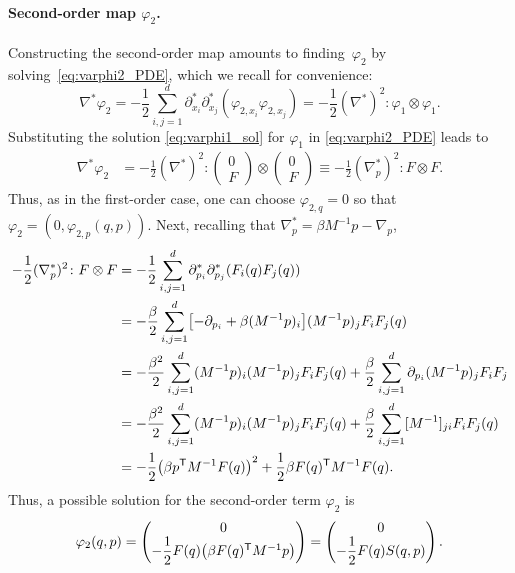 \paragraph{Second-order map $\varphi_2$.} Constructing the second-order map amounts to finding~$\varphi_2$ by solving~\eqref{eq:varphi2_PDE}, which we recall for convenience:
%
\begin{equation}
	\nabla^*\varphi_2 = -\frac{1}{2}\sum_{i,j=1}^d \partial_{x_i}^*\partial_{x_j}^* (\varphi_{2,x_i}\varphi_{2,x_j}) = -\frac{1}{2}(\nabla^*)^2 \colon \varphi_1\otimes \varphi_1.
\end{equation}
%
Substituting the solution \eqref{eq:varphi1_sol} for $\varphi_1$ in \eqref{eq:varphi2_PDE} leads to
%
\begin{align}
    \nabla^*\varphi_2 &= -\frac{1}{2}(\nabla^*)^2\colon 
    \begin{pmatrix}
        0 \\ F    
    \end{pmatrix} \otimes 
    \begin{pmatrix}
        0 \\ F    
    \end{pmatrix} \equiv -\frac{1}{2}(\nabla_p^*)^2 \colon F\otimes F.
\end{align}
%
Thus, as in the first-order case, one can choose $\varphi_{2,q} = 0$ so that $\varphi_2 = (0, \varphi_{2,p}(q,p))$. Next, recalling that $\nabla^*_p = \beta M^{-1}p - \nabla_p$,
%
\begin{align}
    -\frac{1}{2}(\nabla_p^*)^2 \colon F\otimes F &= -\frac{1}{2}\sum_{i,j=1}^d \partial_{p_i}^*\partial_{p_j}^* \paren*{F_i(q)F_j(q)} \\
    &= -\frac{\beta}{2}\sum_{i,j=1}^d \bkt*{-\partial_{p_i} + \beta (M^{-1}p)_i}(M^{-1}p)_j F_iF_j(q) \\
    &= -\frac{\beta^2}{2}\sum_{i,j=1}^d (M^{-1}p)_i(M^{-1}p)_j F_iF_j(q) + \frac{\beta}{2} \sum_{i,j=1}^d \partial_{p_i}(M^{-1}p)_j F_iF_j \\
    &= -\frac{\beta^2}{2}\sum_{i,j=1}^d (M^{-1}p)_i(M^{-1}p)_j F_iF_j(q) +\frac{\beta}{2}\sum_{i,j=1}^d [M^{-1}]_{ji} F_iF_j(q) \\
    &= -\frac{1}{2}\paren*{\beta p^\t M^{-1}F(q)}^2 + \frac{1}{2}\beta F(q)^\t M^{-1}F(q).
\end{align}
%
Thus, a possible solution for the second-order term $\varphi_2$ is
%
\begin{equation}
    \varphi_2(q,p) = 
    \begin{pmatrix}
        0 \\ -\dfrac{1}{2}F(q)\paren*{\beta F(q)^\t M^{-1} p}
    \end{pmatrix} = 
    \begin{pmatrix}
        0 \\ -\dfrac{1}{2}F(q)S(q,p)
    \end{pmatrix}.
\end{equation}
